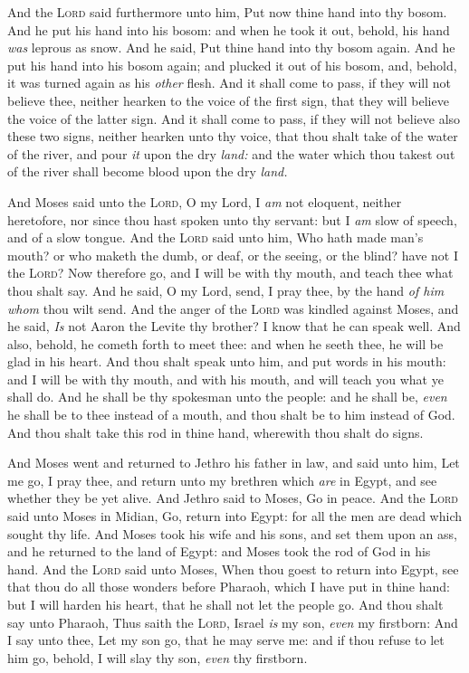 \documentclass[11pt,letterpaper,oneside]{memoir}
\begin{document}
And the \textsc{Lord} said furthermore unto him, Put now thine hand into
thy bosom. And he put his hand into his bosom: and when he took it out,
behold, his hand \emph{was} leprous as snow. And he said, Put thine hand
into thy bosom again. And he put his hand into his bosom again; and
plucked it out of his bosom, and, behold, it was turned again as his
\emph{other} flesh. And it shall come to pass, if they will not believe
thee, neither hearken to the voice of the first sign, that they will
believe the voice of the latter sign. And it shall come to pass, if they
will not believe also these two signs, neither hearken unto thy voice,
that thou shalt take of the water of the river, and pour \emph{it} upon
the dry \emph{land:} and the water which thou takest out of the river
shall become blood upon the dry \emph{land.}

And Moses said unto the \textsc{Lord}, O my Lord, I \emph{am} not
eloquent, neither heretofore, nor since thou hast spoken unto thy
servant: but I \emph{am} slow of speech, and of a slow tongue. And the
\textsc{Lord} said unto him, Who hath made man's mouth? or who maketh
the dumb, or deaf, or the seeing, or the blind? have not I the
\textsc{Lord}? Now therefore go, and I will be with thy mouth, and teach
thee what thou shalt say. And he said, O my Lord, send, I pray thee, by
the hand \emph{of him whom} thou wilt send. And the anger of the
\textsc{Lord} was kindled against Moses, and he said, \emph{Is} not
Aaron the Levite thy brother? I know that he can speak well. And also,
behold, he cometh forth to meet thee: and when he seeth thee, he will be
glad in his heart. And thou shalt speak unto him, and put words in his
mouth: and I will be with thy mouth, and with his mouth, and will teach
you what ye shall do. And he shall be thy spokesman unto the people: and
he shall be, \emph{even} he shall be to thee instead of a mouth, and
thou shalt be to him instead of God. And thou shalt take this rod in
thine hand, wherewith thou shalt do signs.

And Moses went and returned to Jethro his father in law, and said unto
him, Let me go, I pray thee, and return unto my brethren which
\emph{are} in Egypt, and see whether they be yet alive. And Jethro said
to Moses, Go in peace. And the \textsc{Lord} said unto Moses in Midian,
Go, return into Egypt: for all the men are dead which sought thy life.
And Moses took his wife and his sons, and set them upon an ass, and he
returned to the land of Egypt: and Moses took the rod of God in his
hand. And the \textsc{Lord} said unto Moses, When thou goest to return
into Egypt, see that thou do all those wonders before Pharaoh, which I
have put in thine hand: but I will harden his heart, that he shall not
let the people go. And thou shalt say unto Pharaoh, Thus saith the
\textsc{Lord}, Israel \emph{is} my son, \emph{even} my firstborn: And I
say unto thee, Let my son go, that he may serve me: and if thou refuse
to let him go, behold, I will slay thy son, \emph{even} thy firstborn.
\end{document}
